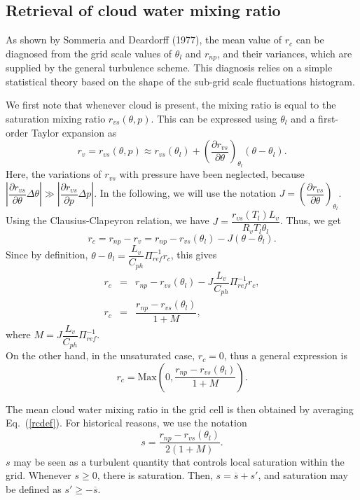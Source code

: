 \subsection{Retrieval of cloud water mixing ratio}

As shown by Sommeria and Deardorff (1977), the mean value of $r_c$ can
be diagnosed from the grid scale values of $\theta_{l}$ and $r_{np}$,
and their variances, which are supplied by the general turbulence scheme.
This diagnosis relies
on a simple statistical theory based on the shape of the sub-grid scale
fluctuations histogram.

We first note that whenever cloud is present, the mixing ratio is equal to
the saturation mixing ratio $r_{vs}(\theta,p)$. This can be expressed using
$\theta_l$ and a first-order Taylor expansion as
\begin{equation}
r_v = r_{vs} \left( \theta,p \right) \approx r_{vs}(\theta_l) +
(\dfrac {\partial r_{vs}} {\partial \theta})_{\theta_l}
(\theta-\theta_l).
\end{equation}
Here, the variations of $r_{vs}$ with pressure have been neglected, because
$|\dfrac {\partial r_{vs}} {\partial \theta}\Delta \theta| \gg
|\dfrac {\partial r_{vs}} {\partial p}\Delta p|$.
In the following, we will use the notation
$J= \left( \dfrac {\partial  r_{vs}} {\partial \theta} \right)_{\theta_l} $.
Using the Clausius-Clapeyron relation, we have
$J = \dfrac {r_{vs}(T_l) L_v} {R_v T_l \theta_l} $.
Thus, we get
\begin{equation}
r_c = r_{np} - r_v = r_{np} - r_{vs}(\theta_l)- J (\theta-\theta_l).
\end{equation}
Since by definition, $\theta-\theta_l=\dfrac{L_v}{C_{ph}}\Pi_{ref}^{-1}r_c$,
this gives
\begin{eqnarray}
r_c &=& r_{np}-r_{vs} (\theta_l)- J \dfrac{L_v}{C_{ph}}\Pi_{ref}^{-1}r_c, \\
r_c &=& \dfrac {r_{np}-r_{vs}(\theta_l)} {1+M},
\end{eqnarray}
where $ M= J \dfrac{L_v}{C_{ph}}\Pi_{ref}^{-1} $. \\

On the other hand, in the unsaturated case, $r_c = 0$, thus a
general expression is
\begin{equation} \label{rcdef}
r_c = \mbox{Max} \left(0,\dfrac {r_{np}-r_{vs}(\theta_l)} {1+M} \right).
\end{equation}

The mean cloud water mixing ratio in the grid cell is then obtained by
averaging Eq.~(\ref{rcdef}). For historical reasons, we use the notation
\begin{equation}\label{eqn:s}
s = \dfrac {r_{np}-r_{vs}(\theta_l)} {2(1+M)}.
\end{equation}
$s$ may be seen as a turbulent quantity that controls local saturation within
the grid. Whenever $s \ge 0$, there is saturation. Then,
$s=\overline{s} + s'$, and saturation may be defined as $s'\ge -\overline{s}$.

